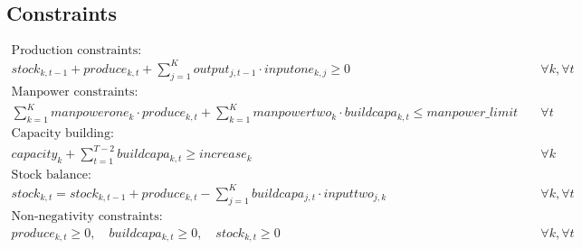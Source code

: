 \documentclass{article}
\begin{document}
\subsection*{Constraints}
\begin{align}
    \text{Production constraints:} \\
    stock_{k, t-1} + produce_{k, t} + \sum_{j=1}^{K} output_{j, t-1} \cdot inputone_{k, j} \geq 0 & \quad \forall k, \forall t \\
    \text{Manpower constraints:} \\
    \sum_{k=1}^{K} manpowerone_{k} \cdot produce_{k, t} + \sum_{k=1}^{K} manpowertwo_{k} \cdot buildcapa_{k, t} \leq manpower\_limit & \quad \forall t \\
    \text{Capacity building:} \\
    capacity_{k} + \sum_{t=1}^{T-2} buildcapa_{k, t} \geq increase_{k} & \quad \forall k \\
    \text{Stock balance:} \\
    stock_{k, t} = stock_{k, t-1} + produce_{k, t} - \sum_{j=1}^{K} buildcapa_{j, t} \cdot inputtwo_{j, k} & \quad \forall k, \forall t \\
    \text{Non-negativity constraints:} \\
    produce_{k, t} \geq 0, \quad buildcapa_{k, t} \geq 0, \quad stock_{k, t} \geq 0 & \quad \forall k, \forall t
\end{align}
\end{document}
